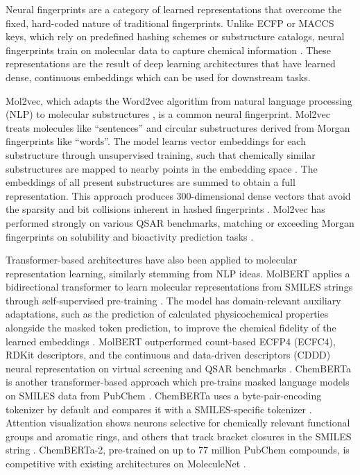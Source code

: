 Neural fingerprints are a category of learned  representations that overcome the fixed, hard-coded nature of traditional fingerprints. Unlike ECFP or MACCS keys, which rely on predefined hashing schemes or substructure catalogs, neural fingerprints train on molecular data to capture chemical information \citep{Jaeger2018, Chithrananda2020}. These representations are the result of deep learning architectures that have learned dense, continuous embeddings which can be used for downstream tasks. 

Mol2vec, which adapts the Word2vec algorithm from natural language processing (NLP) to molecular substructures \citep{Jaeger2018}, is a common neural fingerprint. Mol2vec treats molecules like ``sentences'' and circular substructures derived from Morgan fingerprints like ``words''. The model learns vector embeddings for each substructure through unsupervised training, such that chemically similar substructures are mapped to nearby points in the embedding space \citep{Jaeger2018}. The embeddings of all present substructures are summed to obtain a full representation. This approach produces 300-dimensional dense vectors that avoid the sparsity and bit collisions inherent in hashed fingerprints \citep{Jaeger2018}. Mol2vec has performed strongly on various QSAR benchmarks, matching or exceeding Morgan fingerprints on solubility and bioactivity prediction tasks \citep{Jaeger2018}.

Transformer-based architectures have also been applied to molecular representation learning, similarly stemming from NLP ideas. MolBERT applies a bidirectional transformer to learn molecular representations from SMILES strings through self-supervised pre-training \citep{Fabian2020}. The model has domain-relevant auxiliary adaptations, such as the prediction of calculated physicochemical properties alongside the masked token prediction, to improve the chemical fidelity of the learned embeddings \citep{Fabian2020}. MolBERT outperformed count-based ECFP4 (ECFC4), RDKit descriptors, and the continuous and data-driven descriptors (CDDD) neural representation on virtual screening and QSAR benchmarks \citep{Fabian2020}. ChemBERTa is another transformer-based approach which pre-trains masked language models on SMILES data from PubChem \citep{Chithrananda2020}.  ChemBERTa uses a byte-pair-encoding tokenizer by default and compares it with a SMILES-specific tokenizer \citep{Chithrananda2020}. Attention visualization shows neurons selective for chemically relevant functional groups and aromatic rings, and others that track bracket closures in the SMILES string \citep{Chithrananda2020}. ChemBERTa-2, pre-trained on up to 77 million PubChem compounds, is competitive with existing architectures on MoleculeNet \citep{Ahmad2022}.

